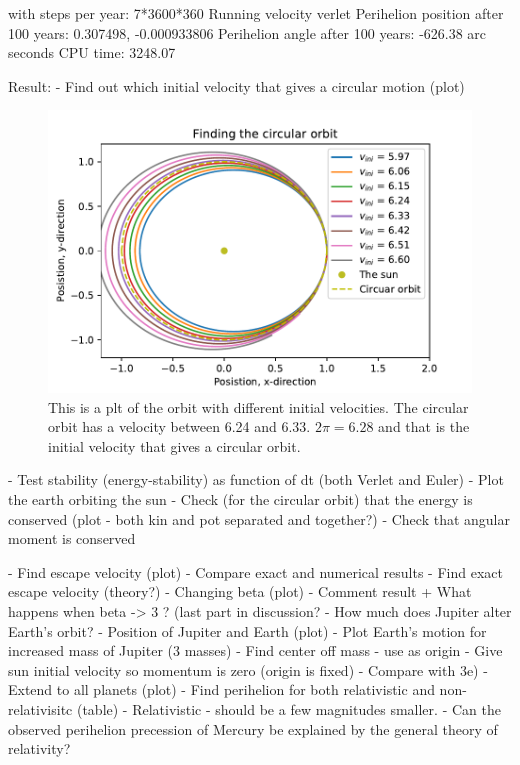with steps per year: 7*3600*360
Running velocity verlet
Perihelion position after 100 years: 0.307498, -0.000933806
Perihelion angle after 100 years: -626.38 arc seconds
CPU time: 3248.07


Result:		
	- Find out which initial velocity that gives a circular motion (plot)
\begin{figure}[H]
\includegraphics[width=1.1\linewidth]{../results/plots/circular_orbit.pdf}\caption{This is a plt of the orbit with different initial velocities. The circular orbit has a velocity between 6.24 and 6.33. $2 \pi = 6.28$ and that is the initial velocity that gives a circular orbit. }\label{fig:circular_orbit}
\end{figure}

	- Test stability (energy-stability) as function of dt (both Verlet and Euler)
	- Plot the earth orbiting the sun
	- Check (for the circular orbit) that the energy is conserved (plot - both kin and pot separated and together?)
	- Check that angular moment is conserved

	- Find escape velocity (plot)
	 	- Compare exact and numerical results
	- Find exact escape velocity (theory?)
	- Changing beta (plot)
		- Comment result + What happens when beta -> 3 ? (last part in discussion?
	- How much does Jupiter alter Earth's orbit?
	- Position of Jupiter and Earth (plot)	
	- Plot Earth's motion for increased mass of Jupiter (3 masses)
	- Find center off mass - use as origin
	- Give sun initial velocity so momentum is zero (origin is fixed)
	- Compare with 3e)
	- Extend to all planets (plot)
	- Find perihelion for both relativistic and non-relativisitc (table)
	- Relativistic - should be a few magnitudes smaller.	
	-  Can the observed perihelion
precession of Mercury be explained by the general theory of relativity?
